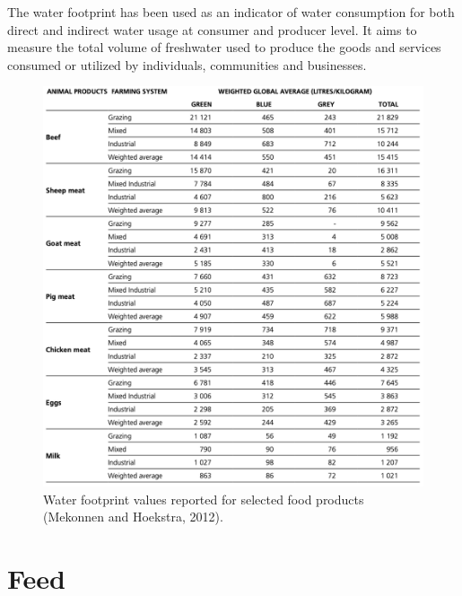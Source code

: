 \documentclass[]{book}
\begin{document}
The water footprint has been used as an indicator of water consumption
for both direct and indirect water usage at consumer and producer level.
It aims to measure the total volume of freshwater used to produce the
goods and services consumed or utilized by individuals, communities and
businesses.

\begin{figure}

{\centering \includegraphics[width=1\linewidth]{figures/water-footprint} 

}

\caption{Water footprint values reported for selected food products (Mekonnen and Hoekstra, 2012).}\label{fig:water-footprint}
\end{figure}

\chapter{Feed}\label{feed}
\end{document}
